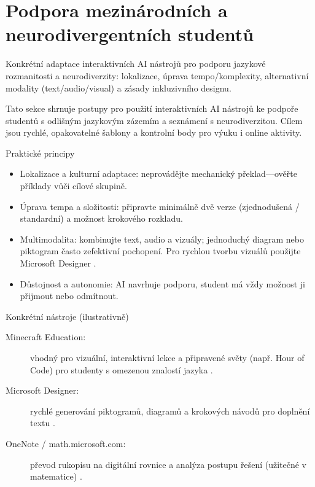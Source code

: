 \documentclass{report}%
\begin{document}
%
\section{Podpora mezinárodních a neurodivergentních studentů}%
Konkrétní adaptace interaktivních AI nástrojů pro podporu jazykové rozmanitosti a neurodiverzity: lokalizace, úprava tempo/komplexity, alternativní modality (text/audio/visual) a zásady inkluzivního designu.%


%
Tato sekce shrnuje postupy pro použití interaktivních AI nástrojů ke podpoře studentů s odlišným jazykovým zázemím a seznámení s neurodiverzitou. Cílem jsou rychlé, opakovatelné šablony a kontrolní body pro výuku i online aktivity.

Praktické principy
\begin{itemize}
  \item Lokalizace a kulturní adaptace: neprovádějte mechanický překlad—ověřte příklady vůči cílové skupině.
  \item Úprava tempa a složitosti: připravte minimálně dvě verze (zjednodušená / standardní) a možnost krokového rozkladu.
  \item Multimodalita: kombinujte text, audio a vizuály; jednoduchý diagram nebo piktogram často zefektivní pochopení. Pro rychlou tvorbu vizuálů použijte Microsoft Designer \cite{kb_ai_101_tipu_pdf_04e4a115_page_51_1}.
  \item Důstojnost a autonomie: AI navrhuje podporu, student má vždy možnost ji přijmout nebo odmítnout.
\end{itemize}

Konkrétní nástroje (ilustrativně)
\begin{description}
  \item[Minecraft Education:] vhodný pro vizuální, interaktivní lekce a připravené světy (např. Hour of Code) pro studenty s omezenou znalostí jazyka \cite{kb_ai_101_tipu_pdf_04e4a115_page_15_2}.
  \item[Microsoft Designer:] rychlé generování piktogramů, diagramů a krokových návodů pro doplnění textu \cite{kb_ai_101_tipu_pdf_04e4a115_page_51_1}.
  \item[OneNote / math.microsoft.com:] převod rukopisu na digitální rovnice a analýza postupu řešení (užitečné v matematice) \cite{kb_ai_101_tipu_pdf_04e4a115_page_8_1}.
\end{description}
\end{document}
